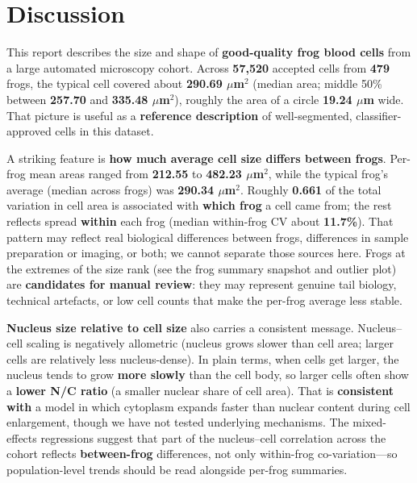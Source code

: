 \documentclass[
  english,
]{article}
\begin{document}
\section{Discussion}\label{discussion}

This report describes the size and shape of \textbf{good-quality frog
blood cells} from a large automated microscopy cohort. Across
\textbf{57,520} accepted cells from \textbf{479} frogs, the typical cell
covered about \textbf{290.69 \(\mu\)m\(^2\)} (median area; middle 50\%
between \textbf{257.70} and \textbf{335.48 \(\mu\)m\(^2\)}), roughly the
area of a circle \textbf{19.24 \(\mu\)m} wide. That picture is useful as
a \textbf{reference description} of well-segmented, classifier-approved
cells in this dataset.

A striking feature is \textbf{how much average cell size differs between
frogs}. Per-frog mean areas ranged from \textbf{212.55} to
\textbf{482.23 \(\mu\)m\(^2\)}, while the typical frog's average (median
across frogs) was \textbf{290.34 \(\mu\)m\(^2\)}. Roughly \textbf{0.661}
of the total variation in cell area is associated with \textbf{which
frog} a cell came from; the rest reflects spread \textbf{within} each
frog (median within-frog CV about \textbf{11.7\%}). That pattern may
reflect real biological differences between frogs, differences in sample
preparation or imaging, or both; we cannot separate those sources here.
Frogs at the extremes of the size rank (see the frog summary snapshot
and outlier plot) are \textbf{candidates for manual review}: they may
represent genuine tail biology, technical artefacts, or low cell counts
that make the per-frog average less stable.

\textbf{Nucleus size relative to cell size} also carries a consistent
message. Nucleus--cell scaling is negatively allometric (nucleus grows
slower than cell area; larger cells are relatively less nucleus-dense).
In plain terms, when cells get larger, the nucleus tends to grow
\textbf{more slowly} than the cell body, so larger cells often show a
\textbf{lower N/C ratio} (a smaller nuclear share of cell area). That is
\textbf{consistent with} a model in which cytoplasm expands faster than
nuclear content during cell enlargement, though we have not tested
underlying mechanisms. The mixed-effects regressions suggest that part
of the nucleus--cell correlation across the cohort reflects
\textbf{between-frog} differences, not only within-frog
co-variation---so population-level trends should be read alongside
per-frog summaries.
\end{document}
